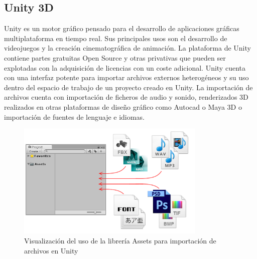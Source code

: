 \documentclass[a4paper]{book}
\begin{document}
\subsection{Unity 3D}
\label{subsec:Unity3D}

Unity es un motor gráfico pensado para el desarrollo de aplicaciones gráficas multiplataforma en tiempo
real. Sus principales usos son el desarrollo de videojuegos y la creación cinematográfica de animación.
La plataforma de Unity contiene partes gratuitas Open Source y otras privativas que pueden ser explotadas
con la adquisición de licencias con un coste adicional. Unity cuenta con una interfaz potente para importar archivos
externos heterogéneos y su uso dentro del espacio de trabajo de un proyecto creado en Unity. La importación de
archivos cuenta con importación de ficheros de audio y sonido, renderizados 3D realizados en otras plataformas de diseño gráfico como
Autocad o Maya 3D o importación de fuentes de lenguaje e idiomas.

\begin{figure}[H]
    \centering
    \includegraphics[width=9cm, keepaspectratio]{img/unity_assets.png}
    \caption{Visualización del uso de la librería Assets para importación de archivos en Unity}
    \label{unity_assets}
\end{figure}
\end{document}
